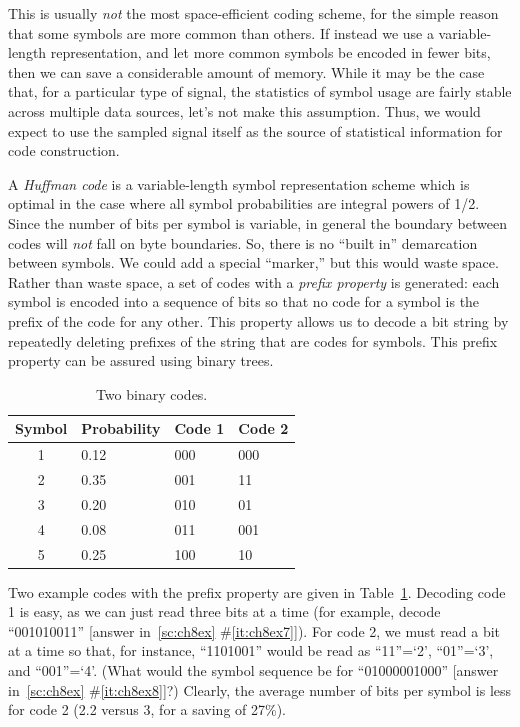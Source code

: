 This is usually \emph{not} the most space-efficient coding scheme, for
the simple reason that some symbols are more common than others.  If
instead we use a variable-length representation, and let more common
symbols be encoded in fewer bits, then we can save a considerable
amount of memory.  While it may be the case that, for a particular
type of signal, the statistics of symbol usage are fairly stable
across multiple data sources, let's not make this assumption. Thus, we
would expect to use the sampled signal itself as the source of
statistical information for code construction.

A \emph{Huffman code} is a variable-length symbol representation
scheme which is optimal in the case where all symbol probabilities are
integral powers of 1/2. Since the number of bits per symbol is
variable, in general the boundary between codes will \emph{not} fall
on byte boundaries. So, there is no ``built in'' demarcation between
symbols.  We could add a special ``marker,'' but this would waste
space.  Rather than waste space, a set of codes with a \emph{prefix
property} is generated: each symbol is encoded into a sequence of bits
so that no code for a symbol is the prefix of the code for any
other. This property allows us to decode a bit string by repeatedly
deleting prefixes of the string that are codes for symbols.  This
prefix property can be assured using binary trees.

\begin{table}[h]
\caption{Two binary codes.\label{tb:prefix}}
\begin{center}
\begin{tabular}{|c|l|l|l|}\hline
\bf Symbol & \bf Probability & \bf Code 1 & \bf Code 2 \\ \hline\hline
1 & 0.12 & 000 & 000 \\
2 & 0.35 & 001 & 11 \\
3 & 0.20 & 010 & 01 \\
4 & 0.08 & 011 & 001 \\
5 & 0.25 & 100 & 10 \\ \hline
\end{tabular}
\end{center}
\end{table}

Two example codes with the prefix property are given in
Table~\ref{tb:prefix}. Decoding code 1 is easy, as we can just read
three bits at a time (for example, decode ``001010011'' [answer
in~\ref{sc:ch8ex}
\#\ref{it:ch8ex7}]).  For code 2, we must read a bit at a time so
that, for instance, ``1101001'' would be read as ``11''=`2',
``01''=`3', and ``001''=`4'. (What would the symbol sequence be for
``01000001000'' [answer in~\ref{sc:ch8ex}
\#\ref{it:ch8ex8}]?)  Clearly, the
average number of bits per symbol is less for code 2 (2.2 versus 3,
for a saving of 27\%).

